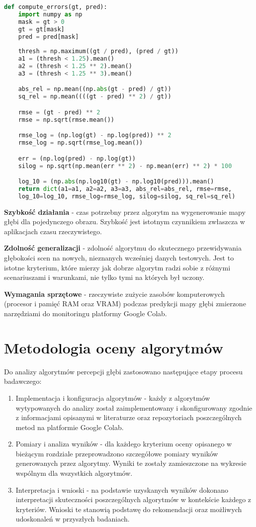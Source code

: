 \begin{lstlisting}[style=EEStyle,language=python,numbers=none,frame=none]
def compute_errors(gt, pred):
    import numpy as np
    mask = gt > 0
    gt = gt[mask]
    pred = pred[mask]
    
    thresh = np.maximum((gt / pred), (pred / gt))
    a1 = (thresh < 1.25).mean()
    a2 = (thresh < 1.25 ** 2).mean()
    a3 = (thresh < 1.25 ** 3).mean()

    abs_rel = np.mean((np.abs(gt - pred) / gt))
    sq_rel = np.mean((((gt - pred) ** 2) / gt))

    rmse = (gt - pred) ** 2
    rmse = np.sqrt(rmse.mean())

    rmse_log = (np.log(gt) - np.log(pred)) ** 2
    rmse_log = np.sqrt(rmse_log.mean())

    err = (np.log(pred) - np.log(gt))
    silog = np.sqrt(np.mean(err ** 2) - np.mean(err) ** 2) * 100

    log_10 = (np.abs(np.log10(gt) - np.log10(pred))).mean()
    return dict(a1=a1, a2=a2, a3=a3, abs_rel=abs_rel, rmse=rmse,
    log_10=log_10, rmse_log=rmse_log, silog=silog, sq_rel=sq_rel)
\end{lstlisting}

\textbf{Szybkość działania} - czas potrzebny przez algorytm na wygenerowanie mapy głębi dla pojedynczego obrazu. Szybkość jest istotnym czynnikiem zwłaszcza w aplikacjach czasu rzeczywistego.

\textbf{Zdolność generalizacji} - zdolność algorytmu do skutecznego przewidywania głębokości scen na nowych, nieznanych wcześniej danych testowych. Jest to istotne kryterium, które mierzy jak dobrze algorytm radzi sobie z różnymi scenariuszami i warunkami, nie tylko tymi na których był uczony.

\textbf{Wymagania sprzętowe} - rzeczywiste zużycie zasobów komputerowych (procesor i pamięć RAM oraz VRAM) podczas predykcji mapy głębi zmierzone narzędziami do monitoringu platformy Google Colab.

\section{Metodologia oceny algorytmów}
Do analizy algorytmów percepcji głębi zastosowano następujące etapy procesu badawczego:
\begin{enumerate}
    \item Implementacja i konfiguracja algorytmów - każdy z algorytmów wytypowanych do analizy został zaimplementowany i skonfigurowany zgodnie z informacjami opisanymi w literaturze oraz repozytoriach poszczególnych metod na platformie Google Colab.
    \item Pomiary i analiza wyników - dla każdego kryterium oceny opisanego w bieżącym rozdziale przeprowadzono szczegółowe pomiary wyników generowanych przez algorytmy. Wyniki te zostały zamieszczone na wykresie wspólnym dla wszystkich algorytmów.
    \item Interpretacja i wnioski - na podstawie uzyskanych wyników dokonano interpretacji skuteczności poszczególnych algorytmów w kontekście każdego z kryteriów. Wnioski te stanowią podstawę do rekomendacji oraz możliwych udoskonaleń w przyszłych badaniach.
\end{enumerate}

